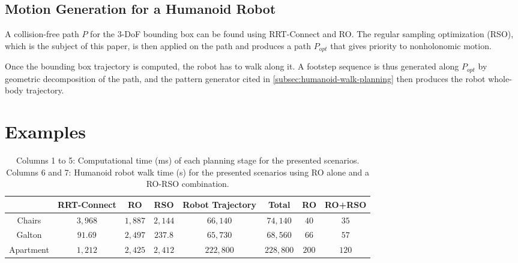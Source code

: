 \subsection{Motion Generation for a Humanoid Robot}

A collision-free path $P$ for the 3-DoF bounding box can be found
using RRT-Connect and RO. The regular sampling optimization (RSO),
which is the subject of this paper, is then applied on the path and
produces a path $P_{opt}$ that gives priority to nonholonomic motion.

Once the bounding box trajectory is computed, the robot has to walk
along it. A footstep sequence is thus generated along $P_{opt}$ by
geometric decomposition of the path, and the pattern generator cited
in \autoref{subsec:humanoid-walk-planning} then produces the robot
whole-body trajectory.

\section{Examples}
\label{examples}

\begin{table}
\label{tab:computation-time}
\centering
\begin{tabular}{c|c|c|c|c|c||c|c|}
  \cline{2-8}
  & RRT-Connect & RO & RSO & Robot Trajectory & Total & RO & RO+RSO\\
  \hline
  \multicolumn{1}{|c|}{Chairs} & $3,968$ & $1,887$ & $2,144$ & $66,140$ & $74,140$ & $40$ & $35$\\
  \hline
  \multicolumn{1}{|c|}{Galton} & $91.69$ & $2,497$ & $237.8$ & $65,730$ & $68,560$ & $66$ & $57$\\
  \hline
  \multicolumn{1}{|c|}{Apartment} & $1,212$ & $2,425$ & $2,412$ & $222,800$ & $228,800$  & $200$ & $120$\\
  \hline
\end{tabular}
\caption{Columns 1 to 5: Computational time (ms) of each planning stage
  for the presented scenarios. Columns 6 and 7: Humanoid robot walk
  time (s) for the presented scenarios using RO alone and a RO-RSO
  combination.}
\end{table}

